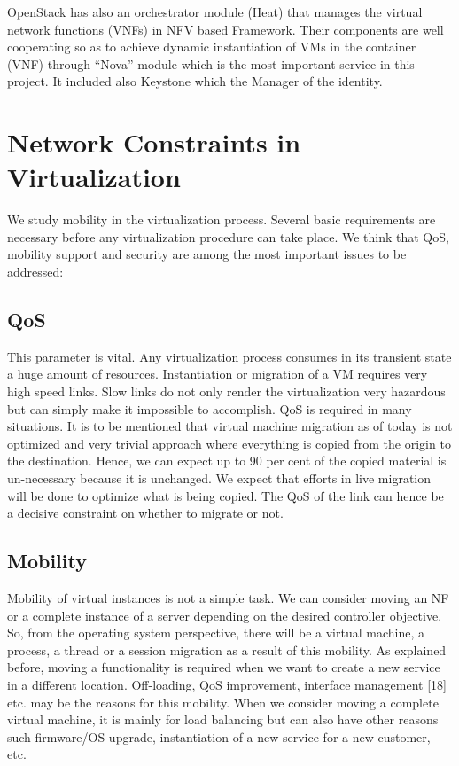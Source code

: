 \documentclass[letterpaper,conference]{IEEEtran}
\begin{document}
OpenStack has also an orchestrator module (Heat) that
manages the virtual network functions (VNFs) in NFV based Framework. Their components are well cooperating so as to achieve dynamic instantiation of VMs in the container (VNF) through “Nova” module which is the most important service in this project. It included also Keystone which the Manager of the identity.

\section{Network Constraints in Virtualization} 

We study mobility in the virtualization process. Several basic requirements are necessary before any virtualization procedure can take place. We think that QoS, mobility support and security are among the most important issues to be addressed:

\subsection{QoS} 

This parameter is vital. Any virtualization process
consumes in its transient state a huge amount of resources. Instantiation or migration of a VM requires very high speed links. Slow links do not only render the virtualization very hazardous but can simply make it impossible to accomplish. QoS is required in many situations.
It is to be mentioned that virtual machine migration as of today is not optimized and very trivial approach where everything is copied from the origin to the destination. Hence, we can expect up to 90 per cent of the copied material is un-necessary because it is unchanged. We expect that efforts in live migration will be done to optimize what is being copied. The QoS of the link can hence be a decisive constraint on whether to migrate or not.

\subsection{Mobility} 

Mobility of virtual instances is not a simple task. We can consider moving an NF or a complete instance of a server depending on the desired controller objective. So, from the operating system perspective, there will be a virtual machine, a process, a thread or a session migration as a result of this mobility. As explained before, moving a functionality is required when we want to create a new service in a different location. Off-loading, QoS improvement, interface management [18] etc. may be the reasons for this mobility. When we consider moving a complete virtual machine, it is mainly for load balancing but can also have other reasons such firmware/OS upgrade, instantiation of a new service for a new customer, etc.
\end{document}
